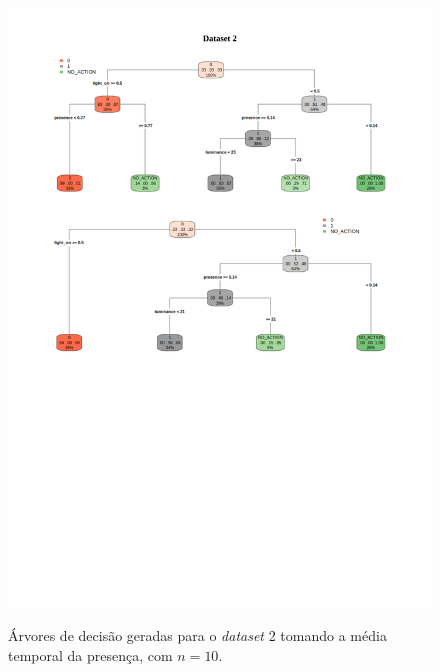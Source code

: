 \begin{figure}[hp]
	\centering
	\caption{Árvores de decisão geradas para o \textit{dataset} 2 tomando a média temporal da presença, com $n=10$.}
  \includegraphics[width=\textwidth]{imagens/teste_learning/5_2.pdf}
  \label{fig:teste_5_2}  
\end{figure}

